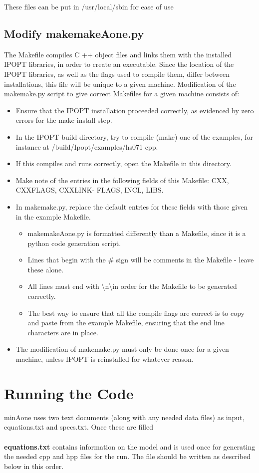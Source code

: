 \documentclass[11pt]{article}
\begin{document}
These files can be put in /usr/local/sbin for ease of use

\subsection*{Modify makemakeAone.py}
The Makefile compiles C ++ object files and links them with the installed IPOPT libraries, in order to
create an executable. Since the location of the IPOPT libraries, as well as the flags used to compile them,
differ between installations, this file will be unique to a given machine. Modification of the makemake.py
script to give correct Makefiles for a given machine consists of:
\begin{itemize}
\item Ensure that the IPOPT installation proceeded correctly, as evidenced by zero errors for the make install step.
\item In the IPOPT build directory, try to compile (make) one of the examples, for instance at
/build/Ipopt/examples/hs071 cpp.
\item If this compiles and runs correctly, open the Makefile in this directory.
\item Make note of the entries in the following fields of this Makefile: CXX, CXXFLAGS, CXXLINK-
FLAGS, INCL, LIBS.
\item In makemake.py, replace the default entries for these fields with those given in the example Makefile.
\begin{itemize}
\item makemakeAone.py is formatted differently than a Makefile, since it is a python code generation script.
\item Lines that begin with the \# sign will be comments in the Makefile - leave these alone.
\item All lines must end with \textbackslash n\textbackslash in order for the Makefile to be generated correctly.
\item The best way to ensure that all the compile flags are correct is to copy and paste from the
example Makefile, ensuring that the end line characters are in place.
\end{itemize}
\item The modification of makemake.py must only be done once for a given machine, unless IPOPT is
reinstalled for whatever reason.
\end{itemize}
\pagebreak
\section{Running the Code}
minAone uses two text documents (along with any needed data files) as input, equations.txt and specs.txt.  Once these are filled
\\
\bigskip
\\
{\bf equations.txt} contains information on the model and is used once for generating the needed cpp and hpp files for the run.  The file should be written as described below in this order.
\end{document}
